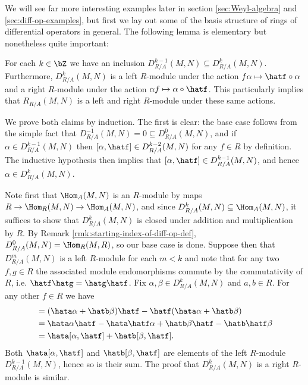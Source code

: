 We will see far more interesting examples later in section \ref{sec:Weyl-algebra} and \ref{sec:diff-op-examples}, but first we lay out some of the basis structure of rings of differential operators in general. The following lemma is elementary but nonetheless quite important:
\begin{lem}\label{lem:fixed-order-ops-form-module}
	For each $k \in \bZ$ we have an inclusion $D^{k-1}_{R/A}(M,N) \subseteq D^k_{R/A}(M,N)$. Furthermore, $D^k_{R/A}(M,N)$ is a left $R$-module under the action $f\alpha \mapsto \hatf\circ \alpha$ and a right $R$-module under the action $\alpha f \mapsto \alpha \circ \hatf$. This particularly implies that $R_{R/A}(M,N)$ is a left and right $R$-module under these same actions.
\end{lem}
\begin{prf}
	We prove both claims by induction. The first is clear: the base case follows from the simple fact that $D^{-1}_{R/A}(M,N) = 0 \subseteq D^0_{R/A}(M,N)$, and if $\alpha \in D^{k-1}_{R/A}(M,N)$ then $[\alpha,\hatf] \in D^{k-2}_{R/A}(M,N)$ for any $f \in R$ by definition. The inductive hypothesis then implies that $[\alpha,\hatf] \in D^{k-1}_{R/A}(M,N)$, and hence $\alpha \in D^k_{R/A}(M,N)$.

	Note first that $\Hom_A(M,N)$ is an $R$-module by maps $R\to \Hom_R(M,N) \to \Hom_A(M,N)$, and since $D^k_{R/A}(M,N)\subseteq \Hom_A(M,N)$, it suffices to show that $D^k_{R/A}(M,N)$ is closed under addition and multiplication by $R$. By Remark \ref{rmk:starting-index-of-diff-op-def}, $D^0_{R/A}(M,N) = \Hom_R(M,R)$, so our base case is done. Suppose then that $D^m_{R/A}(M,N)$ is a left $R$-module for each $m < k$ and note that for any two $f,g\in R$ the associated module endomorphisms commute by the commutativity of $R$, i.e. $\hatf\hatg = \hatg\hatf$. Fix $\alpha,\beta \in D^k_{R/A}(M,N)$ and $a,b \in R$. For any other $f \in R$ we have
	\begin{align*}
		[\hata\alpha + \hatb\beta, \hatf] 
		  &= (\hata\alpha + \hatb\beta)\hatf - \hatf(\hata\alpha + \hatb\beta) \\
		  &= \hata\alpha\hatf - \hata\hatf\alpha + \hatb\beta\hatf - \hatb\hatf\beta \\
		  &= \hata[\alpha,\hatf] + \hatb[\beta,\hatf].
	\end{align*}
	Both $\hata[\alpha,\hatf]$ and $\hatb[\beta,\hatf]$ are elements of the left $R$-module $D^{k-1}_{R/A}(M,N)$, hence so is their sum. The proof that $D^k_{R/A}(M,N)$ is a right $R$-module is similar.
\end{prf}
